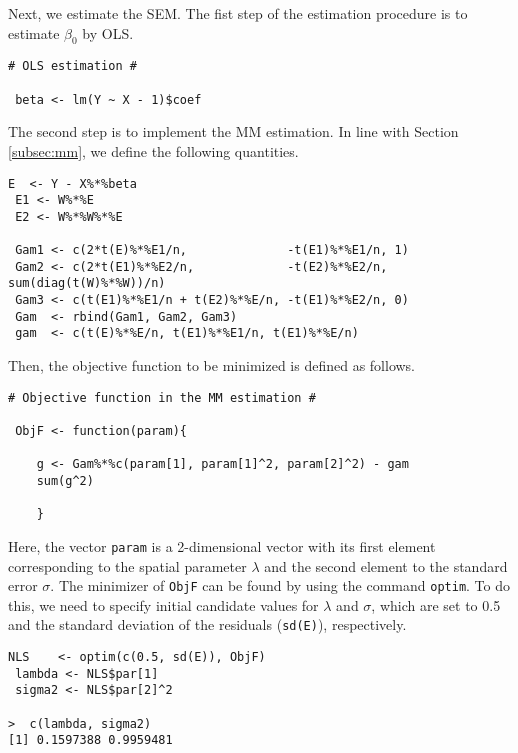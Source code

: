 \documentclass[11pt, A4paper, openany, uplatex]{book}
\begin{document}
Next, we estimate the SEM.
The fist step of the estimation procedure is to estimate $\beta_0$ by OLS. 
\begin{lstlisting}[basicstyle=\ttfamily\footnotesize, frame=single]
# OLS estimation #

 beta <- lm(Y ~ X - 1)$coef
\end{lstlisting}
The second step is to implement the MM estimation.
In line with Section \ref{subsec:mm}, we define the following quantities.
\begin{lstlisting}[basicstyle=\ttfamily\footnotesize, frame=single]
 E  <- Y - X%*%beta
 E1 <- W%*%E
 E2 <- W%*%W%*%E

 Gam1 <- c(2*t(E)%*%E1/n,              -t(E1)%*%E1/n, 1)
 Gam2 <- c(2*t(E1)%*%E2/n,             -t(E2)%*%E2/n, sum(diag(t(W)%*%W))/n) 
 Gam3 <- c(t(E1)%*%E1/n + t(E2)%*%E/n, -t(E1)%*%E2/n, 0)
 Gam  <- rbind(Gam1, Gam2, Gam3)
 gam  <- c(t(E)%*%E/n, t(E1)%*%E1/n, t(E1)%*%E/n)
\end{lstlisting}
Then, the objective function to be minimized is defined as follows.
\begin{lstlisting}[basicstyle=\ttfamily\footnotesize, frame=single]
# Objective function in the MM estimation #

 ObjF <- function(param){

	g <- Gam%*%c(param[1], param[1]^2, param[2]^2) - gam
	sum(g^2)

	}
\end{lstlisting}
Here, the vector \texttt{param} is a 2-dimensional vector with its first element corresponding to the spatial parameter $\lambda$ and the second element to the standard error $\sigma$.
The minimizer of \texttt{ObjF} can be found by using the command \texttt{optim}.
To do this, we need to specify initial candidate values for $\lambda$ and $\sigma$, which are set to 0.5 and the standard deviation of the residuals (\texttt{sd(E)}), respectively.
\begin{lstlisting}[basicstyle=\ttfamily\footnotesize, frame=single]
 NLS    <- optim(c(0.5, sd(E)), ObjF)
 lambda <- NLS$par[1]
 sigma2 <- NLS$par[2]^2

>  c(lambda, sigma2)
[1] 0.1597388 0.9959481
\end{lstlisting}
\end{document}
